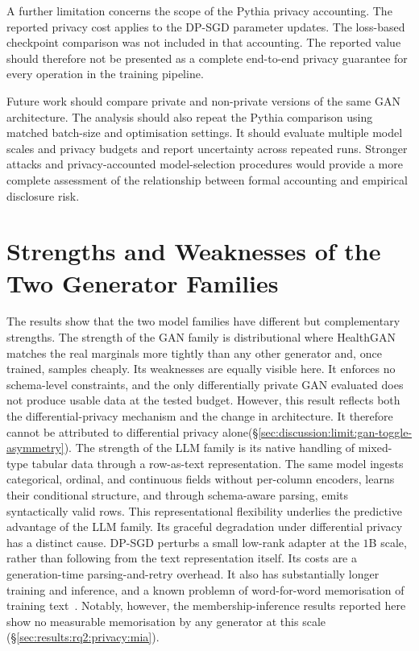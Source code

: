 A further limitation concerns the scope of the Pythia privacy accounting.
The reported privacy cost applies to the DP-SGD parameter updates. The
loss-based checkpoint comparison was not included in that accounting.
The reported value should therefore not be presented as a complete
end-to-end privacy guarantee for every operation in the training
pipeline.

Future work should compare private and non-private versions of the same
GAN architecture. The analysis should also repeat the Pythia comparison using matched
batch-size and optimisation settings. It should evaluate multiple model
scales and privacy budgets and report uncertainty across repeated runs.
Stronger attacks and privacy-accounted model-selection procedures would
provide a more complete assessment of the relationship between formal
accounting and empirical disclosure risk.

\section{Strengths and Weaknesses of the Two Generator Families}
\label{sec:discussion:gan-vs-llm}

The results show that the two model families have different but
complementary strengths. The strength of the
GAN family is distributional where HealthGAN matches the real marginals more
tightly than any other generator and, once trained, samples cheaply. Its
weaknesses are equally visible here. It enforces no schema-level
constraints, and the only differentially private GAN evaluated does not
produce usable data at the tested budget. However, this result reflects both 
the differential-privacy mechanism
and the change in architecture. It therefore cannot be attributed to
differential privacy alone(\S\ref{sec:discussion:limit:gan-toggle-asymmetry}). 
The strength of the LLM family
is its native handling of mixed-type tabular data through a row-as-text
representation. The same model ingests categorical, ordinal, and continuous
fields without per-column encoders, learns their conditional structure, and
through schema-aware parsing, emits syntactically valid rows. This
representational flexibility underlies the predictive advantage of the LLM
family. Its graceful degradation under differential privacy has a distinct
cause. DP-SGD perturbs a small low-rank adapter at the $1$B
scale, rather than following from the text representation itself. Its
costs are a generation-time parsing-and-retry overhead. It also has substantially longer
training and inference, and a known problemn of word-for-word memorisation
of training text~\cite{Carlini2021Extracting}. Notably, however, the
membership-inference results reported here show no measurable memorisation by
any generator at this scale (\S\ref{sec:results:rq2:privacy:mia}).

